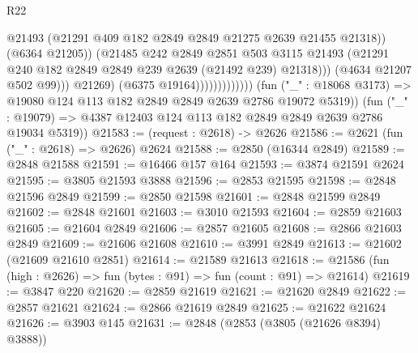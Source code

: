 \begin{lexlean}{R22}
\begin{coremodule}
                                            @21493
                                            (@21291
                                              @409
                                              @182
                                              @2849
                                              @2849
                                              @21275
                                              @2639
                                              @21455
                                              @21318))
                                          (@6364 @21205))
                                        (@21485
                                          @242
                                          @2849
                                          @2851
                                          @503
                                          @3115
                                          @21493
                                          (@21291
                                            @240
                                            @182
                                            @2849
                                            @2849
                                            @239
                                            @2639
                                            (@21492 @239)
                                            @21318)))
                                      (@4634 @21207 @502 @99)))
                                  @21269)
                                (@6375 @19164)))))))))))))
        (fun ("_" : @18068 @3173) => @19080 @124 @113 @182 @2849 @2849 @2639 @2786 @19072 @5319))
      (fun ("_" : @19079) => @4387 @12403 @124 @113 @182 @2849 @2849 @2639 @2786 @19034 @5319))
@21583 := (request : @2618) -> @2626
@21586 := @2621 (fun ("_" : @2618) => @2626) @2624
@21588 := @2850 (@16344 @2849)
@21589 := @2848 @21588
@21591 := @16466 @157 @164
@21593 := @3874 @21591 @2624
@21595 := @3805 @21593 @3888
@21596 := @2853 @21595
@21598 := @2848 @21596 @2849
@21599 := @2850 @21598
@21601 := @2848 @21599 @2849
@21602 := @2848 @21601
@21603 := @3010 @21593
@21604 := @2859 @21603
@21605 := @21604 @2849
@21606 := @2857 @21605
@21608 := @2866 @21603 @2849
@21609 := @21606 @21608
@21610 := @3991 @2849
@21613 := @21602 (@21609 @21610 @2851)
@21614 := @21589 @21613
@21618 := @21586 (fun (high : @2626) => fun (bytes : @91) => fun (count : @91) => @21614)
@21619 := @3847 @220
@21620 := @2859 @21619
@21621 := @21620 @2849
@21622 := @2857 @21621
@21624 := @2866 @21619 @2849
@21625 := @21622 @21624
@21626 := @3903 @145
@21631 := @2848 (@2853 (@3805 (@21626 @8394) @3888))

\end{coremodule}
\end{lexlean}
